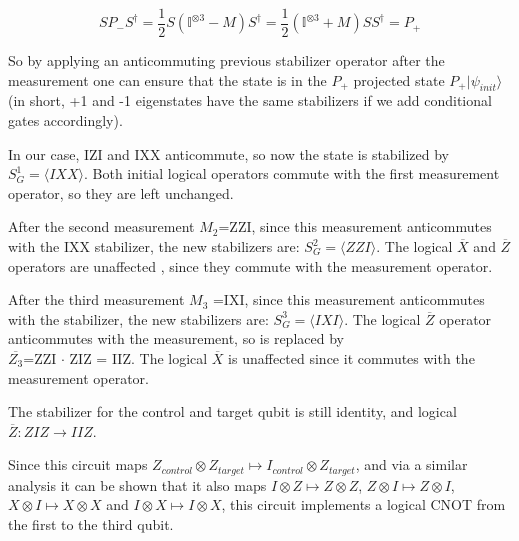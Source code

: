 \begin{equation}
	SP_{-}S^{\dagger} = \frac{1}{2}S\left( 
	\mathbb{I}^{\otimes 3} - M \right) S^{\dagger}
	= \frac{1}{2} \left( \mathbb{I}^{\otimes 3} + M \right)
	SS^{\dagger} = P_{+}
\end{equation}

So by applying an anticommuting previous stabilizer operator
after the measurement one can ensure that the state is in the
$P_{+}$ projected state $P_{+}|\psi_{init}\rangle$ (in short,
+1 and -1 eigenstates have the same stabilizers if we add 
conditional gates accordingly).


In our case, IZI and IXX anticommute,
so now the state is stabilized by $S^{1}_{G} = \langle IXX
\rangle$. Both initial logical operators commute with the first
measurement operator, so they are left unchanged.

After the second measurement $M_{2}$=ZZI, since this
measurement anticommutes with the IXX stabilizer, the new 
stabilizers are: $S^{2}_{G}=\langle ZZI \rangle$. The logical 
$\overline{X}$ and $\overline{Z}$ operators are unaffected
, since they commute with the measurement operator.

After the third measurement $M_{3}$ =IXI, since this measurement
anticommutes with the stabilizer, the new stabilizers are:
$S^{3}_{G}= \langle IXI \rangle$. The logical $\overline{Z}$
operator anticommutes with the measurement, so is replaced by\\
$ \overline{Z_{3}} $=ZZI $\cdot$ ZIZ = IIZ\@. The logical 
$ \overline{X} $ is unaffected since it commutes with the
measurement operator. 

The stabilizer for the control and target qubit is still
identity, and logical $\overline{Z}: ZIZ \rightarrow IIZ$.

Since this circuit maps $Z_{control}\otimes Z_{target} \mapsto I_{control}
 \otimes Z_{target}$,
and via a similar analysis it can be shown that it also maps
$I\otimes Z \mapsto Z \otimes Z$, $Z\otimes I \mapsto Z \otimes I$,
$X\otimes I \mapsto X \otimes X$ and $I\otimes X \mapsto I \otimes X$,
this circuit implements a logical CNOT from the first to the third qubit.
